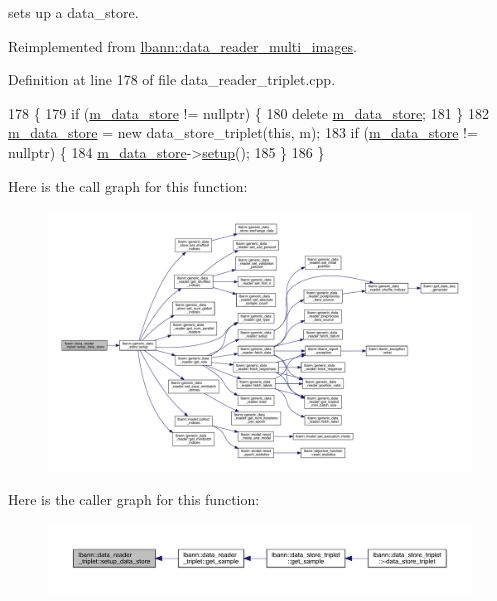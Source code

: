 sets up a data\+\_\+store. 



Reimplemented from \hyperlink{classlbann_1_1data__reader__multi__images_ac4c70724fe5f1378a81394cc2e686297}{lbann\+::data\+\_\+reader\+\_\+multi\+\_\+images}.



Definition at line 178 of file data\+\_\+reader\+\_\+triplet.\+cpp.


\begin{DoxyCode}
178                                                    \{
179   \textcolor{keywordflow}{if} (\hyperlink{classlbann_1_1generic__data__reader_aefc076b842933a882214f4f709ca49c9}{m\_data\_store} != \textcolor{keyword}{nullptr}) \{
180     \textcolor{keyword}{delete} \hyperlink{classlbann_1_1generic__data__reader_aefc076b842933a882214f4f709ca49c9}{m\_data\_store};
181   \}
182   \hyperlink{classlbann_1_1generic__data__reader_aefc076b842933a882214f4f709ca49c9}{m\_data\_store} = \textcolor{keyword}{new} data\_store\_triplet(\textcolor{keyword}{this}, m);
183   \textcolor{keywordflow}{if} (\hyperlink{classlbann_1_1generic__data__reader_aefc076b842933a882214f4f709ca49c9}{m\_data\_store} != \textcolor{keyword}{nullptr}) \{
184     \hyperlink{classlbann_1_1generic__data__reader_aefc076b842933a882214f4f709ca49c9}{m\_data\_store}->\hyperlink{classlbann_1_1generic__data__store_a1cff17def02ee21b6ca0befeb04bb582}{setup}();
185   \}
186 \}
\end{DoxyCode}
Here is the call graph for this function\+:\nopagebreak
\begin{figure}[H]
\begin{center}
\leavevmode
\includegraphics[width=350pt]{classlbann_1_1data__reader__triplet_a2cd6fd46a7d2d90ccd754404683834c6_cgraph}
\end{center}
\end{figure}
Here is the caller graph for this function\+:\nopagebreak
\begin{figure}[H]
\begin{center}
\leavevmode
\includegraphics[width=350pt]{classlbann_1_1data__reader__triplet_a2cd6fd46a7d2d90ccd754404683834c6_icgraph}
\end{center}
\end{figure}


